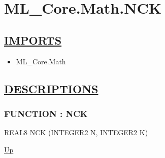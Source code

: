 \chapter*{ML\_Core.Math.NCK}
\hypertarget{ecldoc:toc:ML_Core.Math.NCK}{}

\section*{\underline{IMPORTS}}
\begin{itemize}
\item ML\_Core.Math
\end{itemize}

\section*{\underline{DESCRIPTIONS}}
\subsection*{FUNCTION : NCK}
\hypertarget{ecldoc:ml_core.math.nck}{}
\begin{minipage}[t]{\textwidth}
\begin{flushleft}
REAL8 NCK (INTEGER2 N, INTEGER2 K)
\end{flushleft}
\end{minipage}
\hyperlink{ecldoc:toc:ML_Core/Math}{Up}

\par
\par
